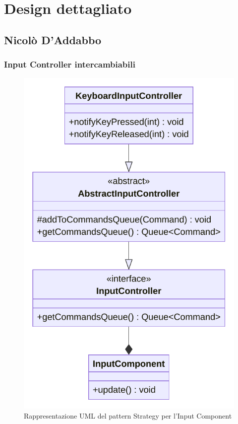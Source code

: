 \documentclass[a4paper,12pt]{report}
\begin{document}
\section{Design dettagliato}

\subsection*{Nicolò D'Addabbo}

\subsubsection{Input Controller intercambiabili}

\begin{figure}[H]
\centering{}
\includegraphics[scale=0.75]{img/InputControllerUML}
\caption{Rappresentazione UML del pattern Strategy per l'Input Component}
\label{img:strategy}
\end{figure}
\end{document}
